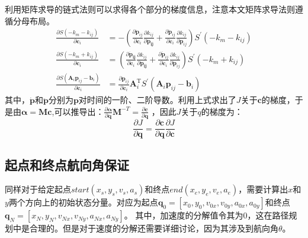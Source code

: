 \documentclass[master,academic]{ysuthesis} %
\begin{document}
		利用矩阵求导的链式法则可以求得各个部分的梯度信息，注意本文矩阵求导法则遵循分母布局。
		\begin{equation}
			\begin{aligned}
				\frac{\partial S( -k_m-k_{ij} )}{\partial \bm{c}_i}&=-( \frac{\partial \dot{\bm{p}}_{ij}}{\partial \bm{c}_i}\frac{\partial k_{ij}}{\partial \bm{\dot{\bm{p}}_{ij}}}+\frac{\partial \ddot{\bm{p}}_{ij}}{\partial \bm{c}_i}\frac{\partial k_{ij}}{\partial \ddot{\bm{p}}_{ij}} ) S^{'} ( -k_m-k_{ij} ) \\
				\frac{\partial S( -k_m+k_{ij} )}{\partial \bm{c}_i}&=( \frac{\partial \bm{\dot{\bm{p}}_{ij}}}{\partial \bm{c}_i}\frac{\partial k_{ij}}{\partial \bm{\dot{\bm{p}}_{ij}}}+\frac{\partial \ddot{\bm{p}}_{ij}}{\partial \bm{c}_i}\frac{\partial k_{ij}}{\partial \ddot{\bm{p}}_{ij}} ) S^{'} ( -k_m+k_{ij} ) \\
				\frac{\partial S( \bm{A}_i\bm{p}_{ij}-\bm{b}_{i} )}{\partial \bm{c}_i}&=\frac{\partial \bm{p}_{ij}}{\partial \bm{c}_i}\bm{A}_{i}^{\mathrm{T}}S^{'}( \bm{A}_i\bm{p}_{ij}-\bm{b}_{i} ) 
			\end{aligned}
		\end{equation}
		其中，$\dot{\bm{p}}$和$\ddot{\bm{p}}$分别为$\bm{p}$对时间的一阶、二阶导数。利用上式求出了$J$关于$\bm{c}$的梯度，于是由$\bm{\alpha} = \bm{M}\bm{c}$,可以推导出：$\frac{\partial \bm{\alpha}}{\partial \bm{q}}\bm{M}^{-T}=\frac{\partial \bm{c}}{\partial \bm{q}}$ ，因此$J$关于$q$的梯度为：
		\begin{equation}
			\frac{\partial J}{\partial \bm{q}}=\frac{\partial \bm{c}}{\partial \bm{q}}\frac{\partial J}{\partial \bm{c}}
		\end{equation}

		\newpage
		\vspace*{-1.5em}

		\subsection{起点和终点航向角保证}
		同样对于给定起点$start(x_s,y_s,v_s,a_s)$和终点$end(x_e,y_e,v_e,a_e)$，需要计算出$x$和$y$两个方向上的初始状态分量。对应为起点$\bm{q}_{0}=[x_0,y_0,v_{0x},v_{0y},a_{0x},a_{0y}]$和终点$\bm{q}_{N}=[x_N,y_N,v_{Nx},v_{Ny},a_{Nx},a_{Ny}]$。 其中，加速度的分解值令其为0，这在路径规划中是合理的。但是对于速度的分解还需要详细讨论，因为其涉及到航向角$\theta$。
\end{document}
